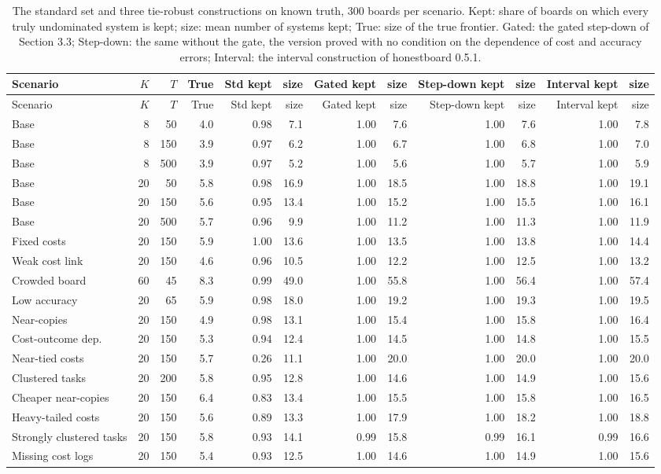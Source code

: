 \begin{longtable}{lrrrrrrrrrrr}
\caption{The standard set and three tie-robust constructions on known truth, 300 boards per scenario. Kept: share of boards on which every truly undominated system is kept; size: mean number of systems kept; True: size of the true frontier. Gated: the gated step-down of Section 3.3; Step-down: the same without the gate, the version proved with no condition on the dependence of cost and accuracy errors; Interval: the interval construction of honestboard 0.5.1.}\label{tab:supp-tierobust}\\
\toprule
Scenario & $K$ & $T$ & True & Std kept & size & Gated kept & size & Step-down kept & size & Interval kept & size \\
\midrule
\endfirsthead
\toprule
Scenario & $K$ & $T$ & True & Std kept & size & Gated kept & size & Step-down kept & size & Interval kept & size \\
\midrule
\endhead
\bottomrule
\endfoot
Base & 8 & 50 & 4.0 & 0.98 & 7.1 & 1.00 & 7.6 & 1.00 & 7.6 & 1.00 & 7.8 \\
Base & 8 & 150 & 3.9 & 0.97 & 6.2 & 1.00 & 6.7 & 1.00 & 6.8 & 1.00 & 7.0 \\
Base & 8 & 500 & 3.9 & 0.97 & 5.2 & 1.00 & 5.6 & 1.00 & 5.7 & 1.00 & 5.9 \\
Base & 20 & 50 & 5.8 & 0.98 & 16.9 & 1.00 & 18.5 & 1.00 & 18.8 & 1.00 & 19.1 \\
Base & 20 & 150 & 5.6 & 0.95 & 13.4 & 1.00 & 15.2 & 1.00 & 15.5 & 1.00 & 16.1 \\
Base & 20 & 500 & 5.7 & 0.96 & 9.9 & 1.00 & 11.2 & 1.00 & 11.3 & 1.00 & 11.9 \\
Fixed costs & 20 & 150 & 5.9 & 1.00 & 13.6 & 1.00 & 13.5 & 1.00 & 13.8 & 1.00 & 14.4 \\
Weak cost link & 20 & 150 & 4.6 & 0.96 & 10.5 & 1.00 & 12.2 & 1.00 & 12.5 & 1.00 & 13.2 \\
Crowded board & 60 & 45 & 8.3 & 0.99 & 49.0 & 1.00 & 55.8 & 1.00 & 56.4 & 1.00 & 57.4 \\
Low accuracy & 20 & 65 & 5.9 & 0.98 & 18.0 & 1.00 & 19.2 & 1.00 & 19.3 & 1.00 & 19.5 \\
Near-copies & 20 & 150 & 4.9 & 0.98 & 13.1 & 1.00 & 15.4 & 1.00 & 15.8 & 1.00 & 16.4 \\
Cost-outcome dep. & 20 & 150 & 5.3 & 0.94 & 12.4 & 1.00 & 14.5 & 1.00 & 14.8 & 1.00 & 15.5 \\
Near-tied costs & 20 & 150 & 5.7 & 0.26 & 11.1 & 1.00 & 20.0 & 1.00 & 20.0 & 1.00 & 20.0 \\
Clustered tasks & 20 & 200 & 5.8 & 0.95 & 12.8 & 1.00 & 14.6 & 1.00 & 14.9 & 1.00 & 15.6 \\
Cheaper near-copies & 20 & 150 & 6.4 & 0.83 & 13.4 & 1.00 & 15.5 & 1.00 & 15.8 & 1.00 & 16.5 \\
Heavy-tailed costs & 20 & 150 & 5.6 & 0.89 & 13.3 & 1.00 & 17.9 & 1.00 & 18.2 & 1.00 & 18.8 \\
Strongly clustered tasks & 20 & 150 & 5.8 & 0.93 & 14.1 & 0.99 & 15.8 & 0.99 & 16.1 & 0.99 & 16.6 \\
Missing cost logs & 20 & 150 & 5.4 & 0.93 & 12.5 & 1.00 & 14.6 & 1.00 & 14.9 & 1.00 & 15.6 \\
\end{longtable}
